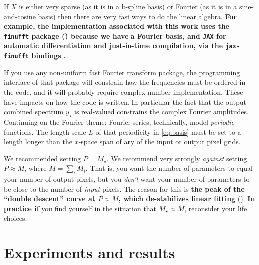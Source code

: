 \documentclass[modern, linenumbers]{aastex631}
\newcommand{\modified}[1]{\textcolor{Emerald}{\textbf{#1}}}
\begin{document}
If $X$ is either very sparse (as it is in a b-spline basis) or Fourier (as it is in a sine-and-cosine basis) then there are very fast ways to do the linear algebra.
\modified{For example, the implementation associated with this work uses the \texttt{finufft} package (\citealt{finufft}) because we have a Fourier basis, and \texttt{JAX} \citep{jax} for automatic differentiation and just-in-time compilation, via the \texttt{jax-finufft} bindings \citep{jax-finufft}.}

If you use any non-uniform fast Fourier transform package, the programming interface of that package will constrain how the frequencies must be ordered in the code, and it will probably require complex-number implementation.
These have impacts on how the code is written.
In particular the fact that the output combined spectrum $y_\star$ is real-valued constrains the complex Fourier amplitudes.
Continuing on the Fourier theme:
Fourier series, technically, model \emph{periodic} functions.
The length scale $L$ of that periodicity in \eqref{eq:basis} must be set to a length longer than the $x$-space span of any of the input or output pixel grids.

We recommended setting $P=M_\star$.
We recommend very strongly \emph{against} setting $P\approx M$, where $M=\sum_i M_i$.
That is, you want the number of parameters to equal your number of output pixels, but you \emph{don't} want your number of parameters to be close to the number of \emph{input} pixels.
The reason for this is \modified{the peak of the ``double descent'' curve at $P\approx M$, which de-stabilizes linear fitting} (\citealt{doubledescent}).
\modified{In practice if}
you find yourself in the situation that $M_\star\approx M$, reconsider your life choices.

\section{Experiments and results}\label{sec:results}
\end{document}
